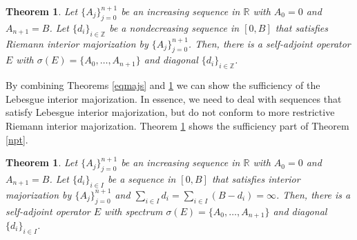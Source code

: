 \documentclass[12pt]{amsart}
\newcounter{Theorem}
\numberwithin{equation}{section}
\numberwithin{Theorem}{section}
\theoremstyle{plain}
\newtheorem{thm}[Theorem]{Theorem}
\theoremstyle{definition}
\theoremstyle{remark}
\begin{document}
\begin{thm}\label{srim}
Let $\{A_j\}_{j=0}^{n+1}$ be an increasing sequence in ${\mathbb{R}}$ with $A_{0}=0$ and $A_{n+1}=B$. Let $\{d_{i}\}_{i\in{\mathbb{Z}}}$ be a nondecreasing sequence in $[0,B]$ that satisfies Riemann interior majorization by $\{A_j\}_{j=0}^{n+1}$.
Then, there is a self-adjoint operator $E$ with $\sigma(E) = \{A_0,\ldots,A_{n+1}\}$ and diagonal $\{d_{i}\}_{i\in{\mathbb{Z}}}$.
\end{thm}

By combining Theorems \ref{eqmajs} and \ref{srim} we can show the sufficiency of the Lebesgue interior majorization. In essence, we need to deal with sequences that satisfy Lebesgue interior majorization, but do not conform to more restrictive Riemann interior majorization. Theorem \ref{inthorn} shows the sufficiency part of Theorem \ref{npt}.

\begin{thm}\label{inthorn}
Let $\{A_j\}_{j=0}^{n+1}$ be an increasing sequence in ${\mathbb{R}}$ with $A_{0}=0$ and $A_{n+1}=B$. Let $\{d_{i}\}_{i\in I}$ be a sequence in $[0,B]$ that satisfies interior majorization by  $\{A_j\}_{j=0}^{n+1}$ and $\sum_{i\in I}d_{i} = \sum_{i\in I}(B-d_{i}) = \infty$.
Then, there is a self-adjoint operator $E$ with spectrum $\sigma(E) = \{A_0,\ldots, A_{n+1}\}$ and diagonal $\{d_{i}\}_{i\in I}$.
\end{thm}
\end{document}
